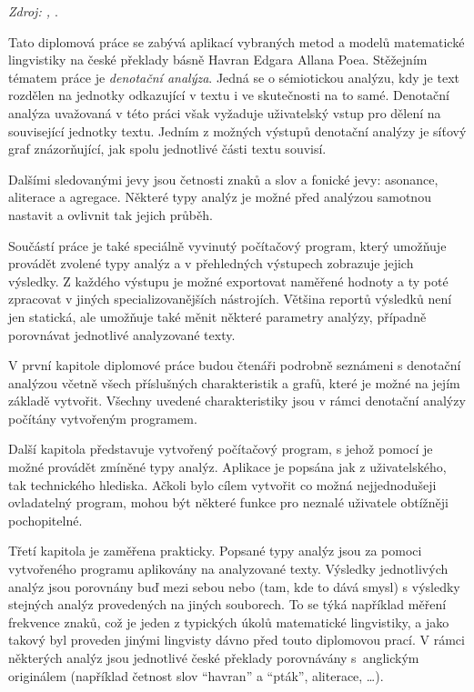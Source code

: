 \documentclass[dp.tex]{subfiles}
\begin{document}
\vspace*{-0.47cm}
\begin{flushright}
\textit{Zdroj: \cite{Cerny1996}, \cite{Cerny1998}}.
\end{flushright}


Tato diplomová práce se zabývá aplikací vybraných metod a modelů matematické lingvistiky na české překlady básně Havran Edgara Allana Poea. Stěžejním tématem práce je \textit{denotační analýza}. Jedná se o sémiotickou analýzu, kdy je text rozdělen na jednotky odkazující v textu i ve skutečnosti na to samé. Denotační analýza uvažovaná v této práci však vyžaduje uživatelský vstup pro dělení na související jednotky textu. Jedním z možných výstupů denotační analýzy je síťový graf znázorňující, jak spolu jednotlivé části textu souvisí.

Dalšími sledovanými jevy jsou četnosti znaků a slov a fonické jevy: asonance, aliterace a agregace. Některé typy analýz je možné před analýzou samotnou nastavit a ovlivnit tak jejich průběh. 

Součástí práce je také speciálně vyvinutý počítačový program, který umožňuje provádět zvolené typy analýz a v přehledných výstupech zobrazuje jejich výsledky. Z každého výstupu je možné exportovat naměřené hodnoty a ty poté zpracovat v jiných specializovanějších nástrojích. Většina reportů výsledků není jen statická, ale umožňuje také měnit některé parametry analýzy, případně porovnávat jednotlivé analyzované texty.

V první kapitole diplomové práce budou čtenáři podrobně seznámeni s denotační analýzou včetně všech příslušných charakteristik a grafů, které je možné na jejím základě vytvořit. Všechny uvedené charakteristiky jsou v rámci denotační analýzy počítány vytvořeným programem.

Další kapitola představuje vytvořený počítačový program, s jehož pomocí je možné provádět zmíněné typy analýz. Aplikace je popsána jak z uživatelského, tak technického hlediska. Ačkoli bylo cílem vytvořit co možná nejjednodušeji ovladatelný program, mohou být některé funkce pro neznalé uživatele obtížněji pochopitelné.

Třetí kapitola je zaměřena prakticky. Popsané typy analýz jsou za pomoci vytvořeného programu aplikovány na analyzované texty. Výsledky jednotlivých analýz jsou porovnány buď mezi sebou nebo (tam, kde to dává smysl) s výsledky stejných analýz provedených na jiných souborech. To se týká například měření frekvence znaků, což je jeden z typických úkolů matematické lingvistiky, a jako takový byl proveden jinými lingvisty dávno před touto diplomovou prací. V rámci některých analýz jsou jednotlivé české překlady porovnávány s~anglickým originálem (například četnost slov \enquote{havran} a \enquote{pták}, aliterace, \ldots).
\end{document}
